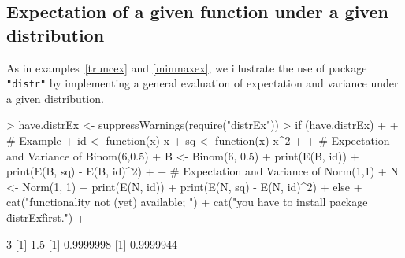 \documentclass[11pt]{article}
\newcommand{\pkg}[1]{{\tt "#1"}}
\begin{document}
\subsection{Expectation of a given function under a given distribution}
\begin{small}
As in examples~\ref{truncex} and \ref{minmaxex}, we illustrate the use of 
package {\tt "distr"} by implementing a general evaluation of expectation 
and variance under a given distribution.
\end{small}
\begin{Schunk}
\begin{Sinput}
> have.distrEx <- suppressWarnings(require("distrEx"))
> if (have.distrEx) 
+    {         
+      # Example
+      id <- function(x) x
+      sq <- function(x) x^2
+      
+      # Expectation and Variance of Binom(6,0.5)
+      B <- Binom(6, 0.5)
+      print(E(B, id))
+      print(E(B, sq) - E(B, id)^2)
+      
+      # Expectation and Variance of Norm(1,1)
+      N <- Norm(1, 1)
+      print(E(N, id))
+      print(E(N, sq) - E(N, id)^2)
+    } else {
+     cat("\n functionality not (yet) available; ")
+     cat("you have to install package \"distrEx\" first.\n")
+    }
\end{Sinput}
\begin{Soutput}
[1] 3
[1] 1.5
[1] 0.9999998
[1] 0.9999944
\end{Soutput}
\end{Schunk}
\end{document}
